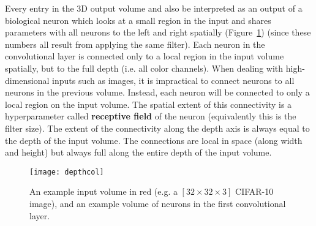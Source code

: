 Every entry in the 3D output volume and also be interpreted as an output of a
biological neuron which looks at a small region in the input and shares
parameters with all neurons to the left and right spatially
(Figure~\ref{fig:cnn_neuron}) (since these numbers all result from applying the
same filter). Each neuron in the convolutional layer is connected only to a
local region in the input volume spatially, but to the full depth (i.e. all
color channels). When dealing with high-dimensional inputs such as images, it is
impractical to connect neurons to all neurons in the previous volume. Instead,
each neuron will be connected to only a local region on the input volume. The
spatial extent of this connectivity is a hyperparameter called
\textbf{receptive field} of the neuron (equivalently this is the filter size).
The extent of the connectivity along the depth axis is always equal to the
depth of the input volume. The connections are local in space (along width
and height) but always full along the entire depth of the input volume.
\begin{figure}[h]
    \centering
    \texttt{[image: depthcol]}
    \caption{An example input volume in red (e.g. a $[32\times32\times3]$
    CIFAR-10 image), and an example volume of neurons in the first
    convolutional layer.}
    \label{fig:cnn_neuron}
\end{figure}


